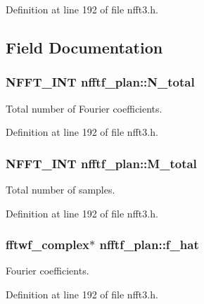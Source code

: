 Definition at line 192 of file nfft3.\-h.



\subsection{Field Documentation}
\hypertarget{structnfftf__plan_ad864531004111d20cd0c817e2a0afc7d}{
\subsubsection[{N\-\_\-total}]{\setlength{\rightskip}{0pt plus 5cm}N\-F\-F\-T\-\_\-\-I\-N\-T nfftf\-\_\-plan\-::\-N\-\_\-total}}\label{structnfftf__plan_ad864531004111d20cd0c817e2a0afc7d}


Total number of Fourier coefficients. 



Definition at line 192 of file nfft3.\-h.

\hypertarget{structnfftf__plan_afbac491ae6584ac676a576ceb681810a}{
\subsubsection[{M\-\_\-total}]{\setlength{\rightskip}{0pt plus 5cm}N\-F\-F\-T\-\_\-\-I\-N\-T nfftf\-\_\-plan\-::\-M\-\_\-total}}\label{structnfftf__plan_afbac491ae6584ac676a576ceb681810a}


Total number of samples. 



Definition at line 192 of file nfft3.\-h.

\hypertarget{structnfftf__plan_aa967453b5ae5ba9e5b2056c884d2cda5}{
\subsubsection[{f\-\_\-hat}]{\setlength{\rightskip}{0pt plus 5cm}fftwf\-\_\-complex$\ast$ nfftf\-\_\-plan\-::f\-\_\-hat}}\label{structnfftf__plan_aa967453b5ae5ba9e5b2056c884d2cda5}


Fourier coefficients. 



Definition at line 192 of file nfft3.\-h.

